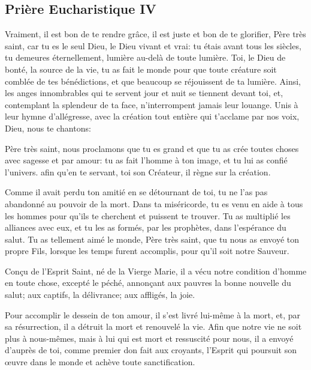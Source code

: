 \subsection*{Prière Eucharistique IV}\label{pe4}

Vraiment, il est bon de te rendre grâce,
il est juste et bon de te glorifier, Père très saint,
car tu es le seul Dieu, le Dieu vivant et vrai:
tu étais avant tous les siècles,
tu demeures éternellement,
lumière au-delà de toute lumière.
Toi, le Dieu de bonté, la source de la vie,
tu as fait le monde
pour que toute créature
soit comblée de tes bénédictions,
et que beaucoup se réjouissent de ta lumière.
Ainsi, les anges innombrables
qui te servent jour et nuit
se tiennent devant toi,
et, contemplant la splendeur de ta face,
n'interrompent jamais leur louange.
Unis à leur hymne d'allégresse,
avec la création tout entière
qui t'acclame par nos voix,
Dieu, nous te chantons:




Père très saint,
nous proclamons que tu es grand
et que tu as crée toutes choses
avec sagesse et par amour:
tu as fait l'homme à ton image,
et tu lui as confié l'univers.
afin qu'en te servant, toi son Créateur,
il règne sur la création.

Comme il avait perdu ton amitié
en se détournant de toi,
tu ne l'as pas abandonné au pouvoir de la mort.
Dans ta miséricorde,
tu es venu en aide à tous les hommes
pour qu'ils te cherchent et puissent te trouver.
Tu as multiplié les alliances avec eux,
et tu les as formés, par les prophètes,
dans l'espérance du salut.
Tu as tellement aimé le monde,
Père très saint,
que tu nous as envoyé ton propre Fils,
lorsque les temps furent accomplis,
pour qu'il soit notre Sauveur.

Conçu de l'Esprit Saint,
né de la Vierge Marie,
il a vécu notre condition d'homme
en toute chose, excepté le péché,
annonçant aux pauvres
la bonne nouvelle du salut;
aux captifs, la délivrance;
aux affligés, la joie.

Pour accomplir le dessein de ton amour,
il s'est livré lui-même à la mort,
et, par sa résurrection,
il a détruit la mort et renouvelé la vie.
Afin que notre vie ne soit plus à nous-mêmes,
mais à lui qui est mort et ressuscité pour nous,
il a envoyé d'auprès de toi,
comme premier don fait aux croyants,
l'Esprit qui poursuit son œuvre dans le monde
et achève toute sanctification.

